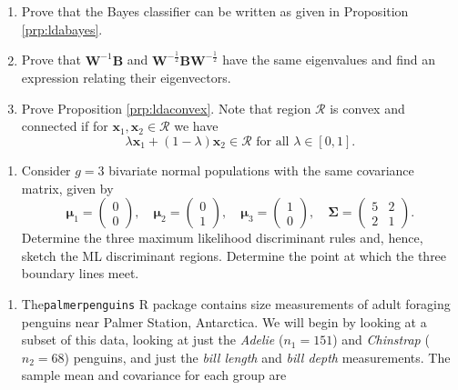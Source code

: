 \documentclass[
]{book}
\providecommand{\tightlist}{%
  \setlength{\itemsep}{0pt}\setlength{\parskip}{0pt}}
\theoremstyle{definition}
\theoremstyle{definition}
\theoremstyle{definition}
\theoremstyle{definition}
\theoremstyle{remark}
\begin{document}
\begin{enumerate}
\def\labelenumi{\arabic{enumi}.}
\item
  Prove that the Bayes classifier can be written as given in Proposition \ref{prp:ldabayes}.
\item
  Prove that \(\mathbf W^{-1}\mathbf B\) and \(\mathbf W^{-\frac{1}{2}}\mathbf B\mathbf W^{-\frac{1}{2}}\) have the same eigenvalues and find an expression relating their eigenvectors.
\item
  Prove Proposition \ref{prp:ldaconvex}. Note that region \(\mathcal{R}\) is convex and connected if for \(\mathbf x_1, \mathbf x_2 \in \mathcal{R}\) we have
  \[\lambda \mathbf x_1+(1-\lambda) \mathbf x_2 \in \mathcal{R} \mbox{ for all } \lambda \in [0,1].\]
\end{enumerate}

\begin{enumerate}
\def\labelenumi{\arabic{enumi}.}
\setcounter{enumi}{3}
\tightlist
\item
  Consider \(g=3\) bivariate normal populations with the same covariance matrix, given by
  \[ {\boldsymbol{\mu}}_1 = \begin{pmatrix} 0 \\ 0 \end{pmatrix}, \quad
  {\boldsymbol{\mu}}_2 = \begin{pmatrix} 0 \\ 1 \end{pmatrix}, \quad
  {\boldsymbol{\mu}}_3 = \begin{pmatrix} 1 \\ 0 \end{pmatrix}, \quad
  \boldsymbol{\Sigma}= \begin{pmatrix} 5 & 2 \\ 2 & 1 \end{pmatrix}.\]
  Determine the three maximum likelihood discriminant rules and, hence, sketch the ML discriminant regions. Determine the point at which the three boundary lines meet.
\end{enumerate}

\begin{enumerate}
\def\labelenumi{\arabic{enumi}.}
\setcounter{enumi}{4}
\tightlist
\item
  The\texttt{palmerpenguins} R package contains size measurements of adult foraging penguins near Palmer Station, Antarctica.
  We will begin by looking at a subset of this data, looking at just the \emph{Adelie} (\(n_1=151\)) and \emph{Chinstrap} (\(n_2=68\)) penguins, and just the \emph{bill length} and \emph{bill depth} measurements. The sample mean and covariance for each group are
\end{enumerate}
\end{document}
